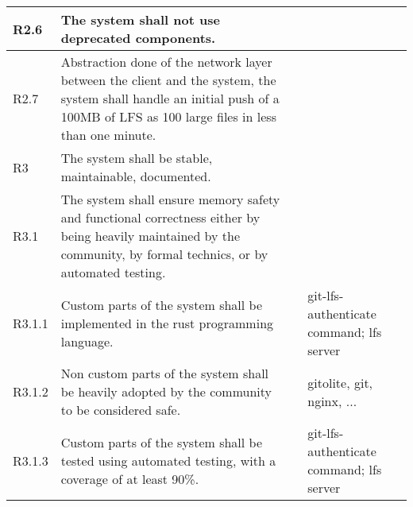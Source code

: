 \documentclass[a4paper,11pt]{article}
\begin{document}
\begin{landscape}
\begin{longtable}{|p{1cm}|p{19cm}|p{2cm}|p{3cm}|}
        \rowcolor[HTML]{DDFFDD}        R2.6       & The system shall not use deprecated components.                                                                                                                                                                                                                                       &                       &                                          \\ \hline
        \rowcolor[HTML]{DDFFDD}        R2.7       & Abstraction done of the network layer between the client and the system, the system shall handle an initial push of a 100MB of LFS as 100 large files in less than one minute.                                                                                                        &                       &                                          \\ \hline
        \rowcolor[HTML]{AAEEAA}        R3         & The system shall be stable, maintainable, documented.                                                                                                                             &                       &                                          \\ \hline
        \rowcolor[HTML]{DDFFDD}        R3.1       & The system shall ensure memory safety and functional correctness either by being heavily maintained by the community, by formal technics, or by automated testing.                                                                                                                    &                       &                                          \\ \hline
        \rowcolor[HTML]{EEFFEE}        R3.1.1     & Custom parts of the system shall be implemented in the rust programming language.                                                                                                                                                                                                     &                       & git-lfs-authenticate command; lfs server \\\hline
        \rowcolor[HTML]{EEFFEE}        R3.1.2     & Non custom parts of the system shall be heavily adopted by the community to be considered safe.                                                                                                                                                                                       &                       & gitolite, git, nginx, ...                \\\hline
        \rowcolor[HTML]{EEFFEE}        R3.1.3     & Custom parts of the system shall be tested using automated testing, with a coverage of at least 90\%.                                                                                                                                                                                 &                       & git-lfs-authenticate command; lfs server \\\hline

\end{longtable}
\end{landscape}
\end{document}

